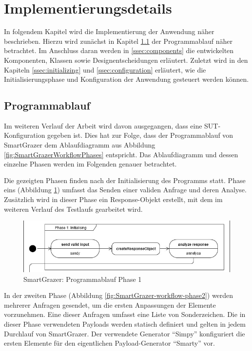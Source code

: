 \section{Implementierungsdetails} \label{sec:implementation_misc}

In folgendem Kapitel wird die Implementierung der Anwendung näher beschrieben. Hierzu wird zunächst in Kapitel \ref{ssec:payload-generation} der Programmablauf näher betrachtet. Im Anschluss daran werden in \ref{ssec:components} die entwickelten Komponenten, Klassen sowie Designentscheidungen erläutert. Zuletzt wird in den Kapiteln \ref{ssec:initializing} und \ref{ssec:configuration} erläutert, wie die Initialisierungsphase und Konfiguration der Anwendung gesteuert werden können.

\subsection{Programmablauf}\label{ssec:payload-generation}
Im weiteren Verlauf der Arbeit wird davon ausgegangen, dass eine SUT-Konfiguration gegeben ist. Dies hat zur Folge, dass der Programmablauf von SmartGrazer dem Ablaufdiagramm aus Abbildung \ref{fig:SmartGrazerWorkflowPhases} entspricht. Das Ablaufdiagramm und dessen einzelne Phasen werden im Folgenden genauer betrachtet.

Die gezeigten Phasen finden nach der Initialisierung des Programms statt. Phase eins (Abbildung \ref{fig:SmartGrazer-workflow-phase1}) umfasst das Senden einer validen Anfrage und deren Analyse. Zusätzlich wird in dieser Phase ein Response-Objekt erstellt, mit dem im weiteren Verlauf des Testlaufs gearbeitet wird.

\begin{figure}[htbp] 
	\centering
	\includegraphics[width=.95\textwidth]{contents/images/SmartGrazerWorkflowPhase1}
	\caption{SmartGrazer: Programmablauf Phase 1}
	\label{fig:SmartGrazer-workflow-phase1}
\end{figure}

\FloatBarrier

In der zweiten Phase (Abbildung \ref{fig:SmartGrazer-workflow-phase2}) werden mehrerer Anfragen gesendet, um die ersten Anpassungen der Elemente vorzunehmen. Eine dieser Anfragen umfasst eine Liste von Sonderzeichen. Die in dieser Phase verwendeten Payloads werden statisch definiert und gelten in jedem Durchlauf von SmartGrazer. Der verwendete Generator ``Simpy'' konfiguriert die ersten Elemente für den eigentlichen Payload-Generator ``Smarty'' vor.

